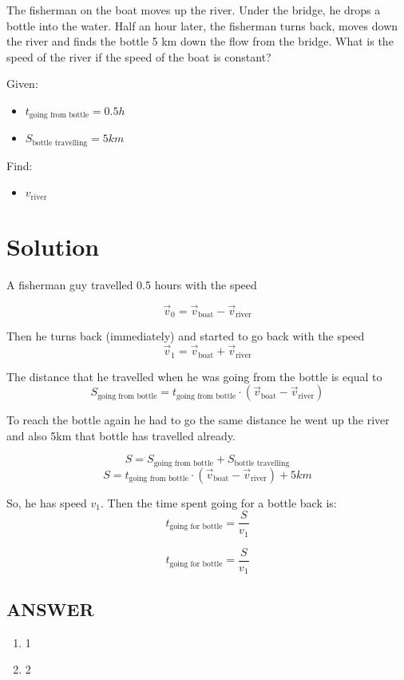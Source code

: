The fisherman on the boat moves up the river. Under the bridge, he drops a bottle into the water.
Half an hour later, the fisherman turns back, moves down the river and finds the bottle 5 km
down the flow from the bridge. What is the speed of the river if the speed of the boat is constant?

\bigbreak Given: \begin{itemize}
    \item $t_{\text{going from bottle}} = 0.5h$
    \item $S_{\text{bottle travelling}} = 5km$
\end{itemize}

Find: \begin{itemize}
    \item $v_{\text{river}}$
\end{itemize}

\section*{Solution}

A fisherman guy travelled 0.5 hours with the speed

$$\Vec{v}_0 = \Vec{v}_{\text{boat}} - \Vec{v}_{\text{river}}$$

Then he turns back (immediately) and started to go back with the speed
\begin{equation}
    
\end{equation}
$$\Vec{v}_1 = \Vec{v}_{\text{boat}} + \Vec{v}_{\text{river}}$$

The distance that he travelled when he was going from the bottle is equal to
$$S_{\text{going from bottle}} = t_{\text{going from bottle}} \cdot (\Vec{v}_{\text{boat}} - \Vec{v}_{\text{river}})$$

To reach the bottle again he had to go the same distance he went up the river and also 5km that bottle has travelled already.

$$S = S_{\text{going from bottle}} + S_{\text{bottle travelling}}$$
$$S =  t_{\text{going from bottle}} \cdot (\Vec{v}_{\text{boat}} - \Vec{v}_{\text{river}}) + 5km$$

So, he has speed $v_1$. Then the time spent going for a bottle back is:
$$t_{\text{going for bottle}} = \frac{S}{v_1}$$

$$t_{\text{going for bottle}} = \frac{S}{v_1}$$


\vfill
\subsection*{ANSWER}
\begin{enumerate}
    \item 1
    \item 2
\end{enumerate}

